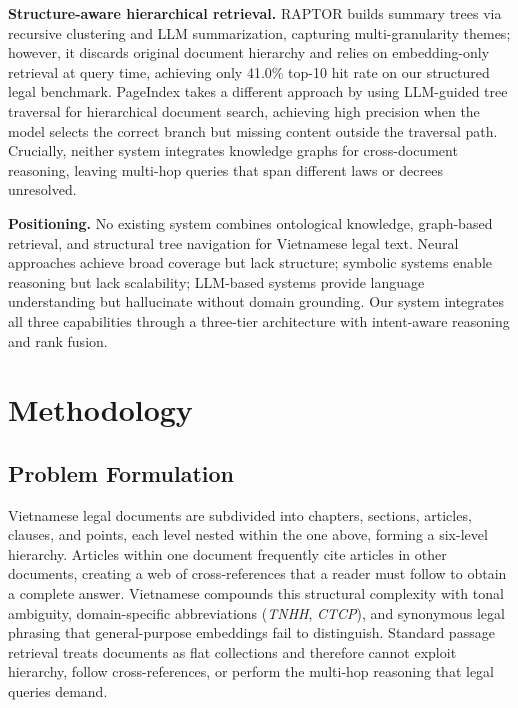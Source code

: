 \documentclass{IOS-Book-Article}
\begin{document}
\textbf{Structure-aware hierarchical retrieval.}
RAPTOR \cite{r29} builds summary trees via recursive clustering and LLM summarization, capturing multi-granularity themes; however, it discards original document hierarchy and relies on embedding-only retrieval at query time, achieving only 41.0\% top-10 hit rate on our structured legal benchmark. PageIndex \cite{r7} takes a different approach by using LLM-guided tree traversal for hierarchical document search, achieving high precision when the model selects the correct branch but missing content outside the traversal path. Crucially, neither system integrates knowledge graphs for cross-document reasoning, leaving multi-hop queries that span different laws or decrees unresolved.

\textbf{Positioning.}
No existing system combines ontological knowledge, graph-based retrieval, and structural tree navigation for Vietnamese legal text. Neural approaches achieve broad coverage but lack structure; symbolic systems enable reasoning but lack scalability; LLM-based systems provide language understanding but hallucinate without domain grounding. Our system integrates all three capabilities through a three-tier architecture with intent-aware reasoning and rank fusion.

\section{Methodology}
\label{sec:method}

\subsection{Problem Formulation}

Vietnamese legal documents are subdivided into chapters, sections, articles, clauses, and points, each level nested within the one above, forming a six-level hierarchy. Articles within one document frequently cite articles in other documents, creating a web of cross-references that a reader must follow to obtain a complete answer. Vietnamese compounds this structural complexity with tonal ambiguity, domain-specific abbreviations (\textit{TNHH}, \textit{CTCP}), and synonymous legal phrasing that general-purpose embeddings fail to distinguish. Standard passage retrieval treats documents as flat collections and therefore cannot exploit hierarchy, follow cross-references, or perform the multi-hop reasoning that legal queries demand.
\end{document}
